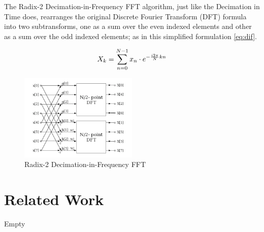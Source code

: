 \documentclass[
  oneside,
  11pt, a4paper,
  footinclude=true,
  headinclude=true,
  cleardoublepage=empty
]{scrbook}
\begin{document}
The Radix-2 Decimation-in-Frequency FFT algorithm, just like the Decimation in Time does, rearranges the original Discrete Fourier Transform (DFT) formula into two subtransforms, one as a sum over the even indexed elements and other as a sum over the odd indexed elements; as in this simplified formulation \autoref{eq:dif}.

\begin{equation} \label{eq:dif}
    X_{k} = \sum_{n=0}^{N-1}x_{n} \cdot e^{- \frac{i 2 \pi}{N}kn} \\
\end{equation}

\begin{figure}[h] 
    \label{fig:dif-fft}
    \centering
    \includegraphics[width=0.5\textwidth]{imgs/dif_fft.png}
    \caption{Radix-2 Decimation-in-Frequency FFT}
\end{figure}


\section{Related Work}


Empty

\cleardoublepage



\printindex

    
    \appendix
    \renewcommand\chaptername{Appendix}
\end{document}

